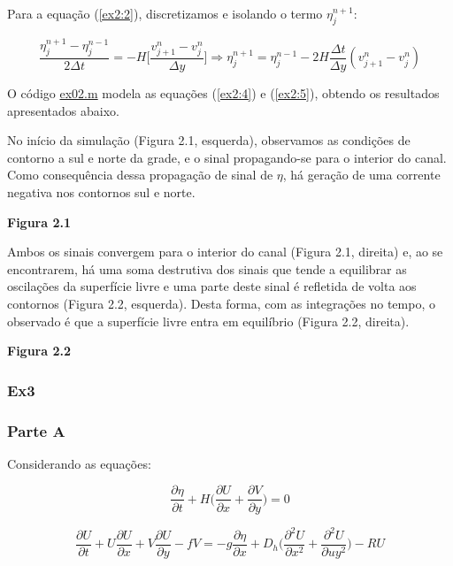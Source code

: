 \documentclass[11pt]{article}
\begin{document}
Para a equação (\ref{ex2:2}), discretizamos e isolando o termo
\(\eta^{n+1}_{j}\):

\begin{equation}
    \frac{\eta^{n+1}_{j} - \eta^{n-1}_{j}}{2\Delta{t}} = -H\bigg[ \frac{v^{n}_{j+1} - v^{n}_{j}}{\Delta{y}} \bigg] \Rightarrow \eta^{n+1}_{j} = \eta^{n-1}_{j} - 2H\frac{\Delta{t}}{\Delta{y}}(v^{n}_{j+1} - v^{n}_{j})
    \label{ex2:5}
\end{equation}

O código \href{../codes/ex02.m}{ex02.m} modela as equações (\ref{ex2:4})
e (\ref{ex2:5}), obtendo os resultados apresentados abaixo.

No início da simulação (Figura 2.1, esquerda), observamos as condições
de contorno a sul e norte da grade, e o sinal propagando-se para o
interior do canal. Como consequência dessa propagação de sinal de
\(\eta\), há geração de uma corrente negativa nos contornos sul e norte.

\textbf{Figura 2.1}

Ambos os sinais convergem para o interior do canal (Figura 2.1, direita)
e, ao se encontrarem, há uma soma destrutiva dos sinais que tende a
equilibrar as oscilações da superfície livre e uma parte deste sinal é
refletida de volta aos contornos (Figura 2.2, esquerda). Desta forma,
com as integrações no tempo, o observado é que a superfície livre entra
em equilíbrio (Figura 2.2, direita).

\textbf{Figura 2.2}

    \subsubsection{Ex3}\label{ex3}

\subsubsection{Parte A}\label{parte-a}

Considerando as equações:

\begin{equation}
    \frac{\partial{\eta}}{\partial{t}} + H \bigg( \frac{\partial{U}}{\partial{x}} + \frac{\partial{V}}{\partial{y}} \bigg) = 0
    \label{ex3A:eq1}
\end{equation}

\begin{equation}
    \frac{\partial{U}}{\partial{t}} + U\frac{\partial{U}}{\partial{x}} + V\frac{\partial{U}}{\partial{y}} - fV = -g\frac{\partial{\eta}}{\partial{x}} + D_h \bigg( \frac{\partial^2{U}}{\partial{x^2}} + \frac{\partial^2{U}}{\partial{uy^2}} \bigg) - RU
    \label{ex3A:eq2}
\end{equation}
\end{document}
